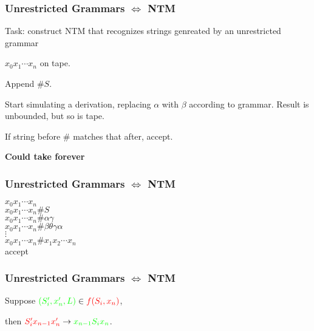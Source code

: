 \documentclass[languages_and_machines.tex]{subfiles}
\begin{document}
\begin{frame}
  \frametitle{Unrestricted Grammars \(\iff\) NTM}

  Task: construct NTM that recognizes strings genreated by an unrestricted grammar

  \(x_0 x_1 \dotsb x_n\) on tape.

  \pause

  Append \(\# S\).

  \pause

  Start simulating a derivation, replacing \(\alpha\) with \(\beta\) according to grammar. Result is unbounded, but so is tape.

  \pause

  If string before \# matches that after, accept.

  \pause

  \textbf{Could take forever}
\end{frame}

\begin{frame}
  \frametitle{Unrestricted Grammars \(\iff\) NTM}

  \(x_0 x_1 \dotsb x_n\) \\
  \pause
  \(x_0 x_1 \dotsb x_n \# S\) \\
  \pause
  \(x_0 x_1 \dotsb x_n \# \alpha \gamma\) \\
  \pause
  \(x_0 x_1 \dotsb x_n \# \beta \theta \gamma \alpha\) \\
  \pause
  \(\vdots\) \\
  \pause
  \(x_0 x_1 \dotsb x_n \# x_1 x_2 \dotsb x_n\) \\
  \pause
  accept
\end{frame}

\begin{frame}
  \frametitle{Unrestricted Grammars \(\iff\) NTM}

  Suppose \(\textcolor{green}{(S_i', x_n', L)} \in \textcolor{red}{f(S_i, x_n)}\),

  then \(\textcolor{red}{S_i' x_{n-1} x_n'} \to \textcolor{green}{x_{n-1} S_i x_n}\).

\end{frame}
\end{document}
